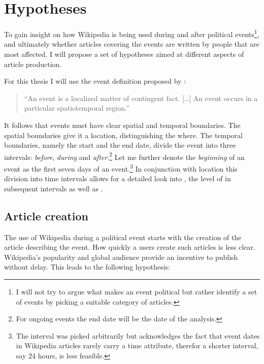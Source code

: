 \chapter{Hypotheses}\label{ch:hypotheses}

To gain insight on how Wikipedia is being used during and after political events\footnote{I will not try to argue what makes an event political but rather identify a set of events by picking a suitable category of articles.}, and ultimately whether articles covering the events are written by people that are most affected, I will propose a set of hypotheses aimed at different aspects of article production.

For this thesis I will use the event definition proposed by \textcite[243]{lewis1987philosophical}: 
\begin{quotation}
``An event is a localized matter of contingent fact. [\ldots] An event occurs in a particular spatiotemporal region.''
\end{quotation}
It follows that events must have clear spatial and temporal boundaries.
The spatial boundaries give it a location, distinguishing the where.
The temporal boundaries, namely the start and the end date, divide the event into three intervals: \emph{before}, \emph{during} and \emph{after}.\footnote{For ongoing events the end date will be the date of the analysis.}
Let me further denote the \emph{beginning} of an event as the first seven days of an event.\footnote{The interval was picked arbitrarily but acknowledges the fact that event dates in Wikipedia articles rarely carry a time attribute, therefor a shorter interval, say 24 hours, is less feasible.}
In conjunction with location this division into time intervals allows for a detailed look into , the level of  in subsequent intervals as well as .

\section{Article creation}\label{sec:articlecreation}

The use of Wikipedia during a political event starts with the creation of the article describing the event.
How quickly a users create such articles is less clear.
Wikipedia's popularity and global audience provide an incentive to publish without delay.
This leads to the following hypothesis:

